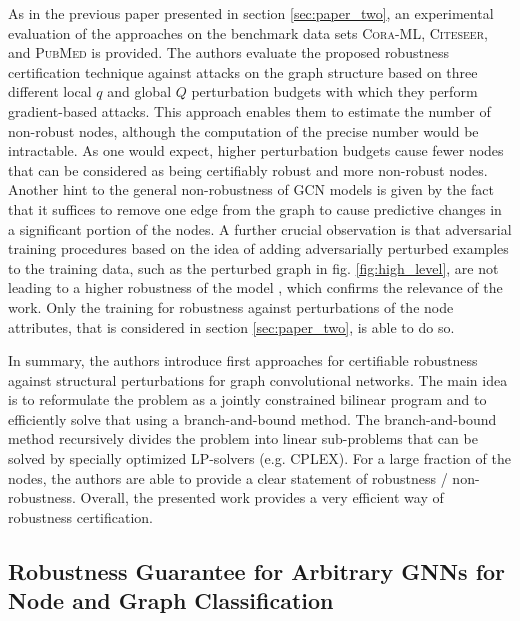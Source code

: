\documentclass[a4paper,preprint]{sig-alternate}
\begin{document}
As in the previous paper presented in section \ref{sec:paper_two}, an experimental evaluation of the approaches on the benchmark data sets 
\textsc{Cora-ML}, \textsc{Citeseer}, and \textsc{PubMed} is provided.
The authors evaluate the proposed robustness certification technique against attacks on the graph structure
based on three different local $q$ and global $Q$ perturbation budgets with which they perform gradient-based attacks.
This approach enables them to estimate the number of non-robust nodes, although the computation of the precise number would be intractable. \cite{10.1145/3394486.3403217}
As one would expect, higher perturbation budgets cause fewer nodes that can be considered as being certifiably robust and 
more non-robust nodes. \cite{10.1145/3394486.3403217}
Another hint to the general non-robustness of GCN models is given by the fact that it suffices to remove one edge from the graph
to cause predictive changes in a significant portion of the nodes. \cite{10.1145/3394486.3403217}
A further crucial observation is that  adversarial training procedures based on the idea of adding adversarially
perturbed examples to the training data, such as the perturbed graph in fig. \ref{fig:high_level}, are not leading to a higher robustness
of the model \cite{10.1145/3394486.3403217}, which confirms the relevance of the work.
Only the training for robustness against perturbations of the node attributes, that is considered in section \ref{sec:paper_two}, is able to do so.\newline

In summary, the authors introduce first approaches for certifiable robustness against structural perturbations for graph convolutional networks.
The main idea is to reformulate the problem as a jointly constrained bilinear program and to efficiently solve that using a branch-and-bound
method. The branch-and-bound method recursively divides the problem into linear sub-problems that can be solved by specially optimized LP-solvers (e.g. CPLEX).
For a large fraction of the nodes, the authors are able to provide a clear statement of robustness / non-robustness.
Overall, the presented work provides a very efficient way of robustness certification.

\subsection{Robustness Guarantee for Arbitrary GNNs for Node and Graph Classification}
\label{sec:paper_four}
\end{document}

